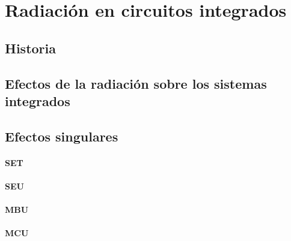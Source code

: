 \chapter{Radiación en circuitos integrados}\label{marco del trabajo}
\section{Historia}
\section{Efectos de la radiación sobre los sistemas integrados}
\section{Efectos singulares}
\subsubsection{SET}
\subsubsection{SEU}
\subsubsection{MBU}
\subsubsection{MCU}